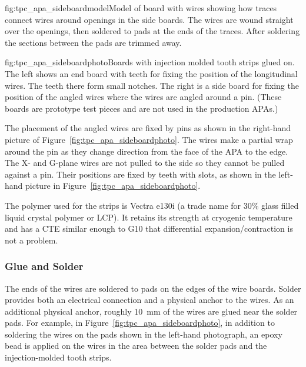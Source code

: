 \begin{dunefigure}{fig:tpc_apa_sideboardmodel}{Model of board with wires showing how traces connect wires around openings in the side boards.  The wires are wound straight over the openings, then soldered to pads at the ends of the traces.  After soldering the sections between the pads are trimmed away.}
\end{dunefigure}


\begin{dunefigure}{fig:tpc_apa_sideboardphoto}{Boards with injection molded tooth strips glued on.  The left shows an end board with teeth for fixing the position of the longitudinal wires.  The teeth there form small notches. The right is a side board for fixing the position of the angled wires where the wires are angled around a pin. (These boards are prototype test pieces and are not used in the production APAs.)}
\end{dunefigure}

The placement of the angled wires are fixed by pins 
as shown in the right-hand picture of Figure~\ref{fig:tpc_apa_sideboardphoto}.  The wires make a partial wrap around the pin as they change direction from the face of the APA to the edge.  The X- and G-plane wires are not pulled to the side so they cannot be pulled against a pin.  Their positions are fixed 
by teeth with slots, as shown in the left-hand picture in Figure~\ref{fig:tpc_apa_sideboardphoto}. 
	
The polymer used for the strips is Vectra e130i (a trade name for 30$\%$ glass filled liquid crystal polymer or LCP). It retains its strength at cryogenic temperature and has a CTE similar enough to G10 that differential expansion/contraction is not a problem.

\subsubsection{Glue and Solder}
The ends of the wires are soldered to pads on the edges of the wire boards.  Solder provides both an electrical connection and a physical anchor to the wires.  As an additional physical anchor, roughly 10~mm of the wires are glued near the solder pads.  For example, in Figure~\ref{fig:tpc_apa_sideboardphoto}, in addition to soldering the wires on the pads shown in the left-hand photograph, an epoxy bead is applied on the wires in the area between the solder pads and the injection-molded tooth strips.

